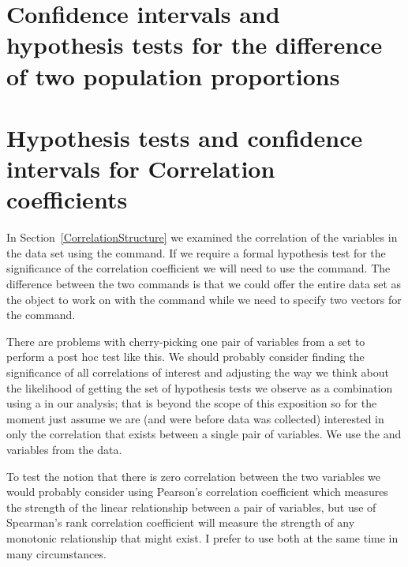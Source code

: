 \section{Confidence intervals and hypothesis tests for the difference of two population proportions} 
 
\section{Hypothesis tests and confidence intervals for Correlation coefficients} 
 
In Section~\ref{CorrelationStructure} 
we examined the correlation of the variables in the  data set using the  command.  
If we require a formal hypothesis test for the significance of the correlation coefficient we will need to use the  command. The difference between the two commands is that we could offer the entire data set as the object to work on with the  command while we need to specify two vectors for the  command. 
 
There are problems with cherry-picking one pair of variables from a set to perform a post hoc test like this. We should probably consider finding the significance of all correlations of interest and adjusting the way we think about the likelihood of getting the set of hypothesis tests we observe as a combination using a  in our analysis; that is beyond the scope of this exposition so for the moment just assume we are (and were before data was collected) interested in only the correlation that exists between a single pair of variables. We use the  and  variables from the  data. 
 
To test the notion that there is zero correlation between the two variables we would probably consider using Pearson's correlation coefficient which measures the strength of the linear relationship between a pair of variables, but use of Spearman's rank correlation coefficient will measure the strength of any monotonic relationship that might exist. I prefer to use both at the same time in many circumstances. 

